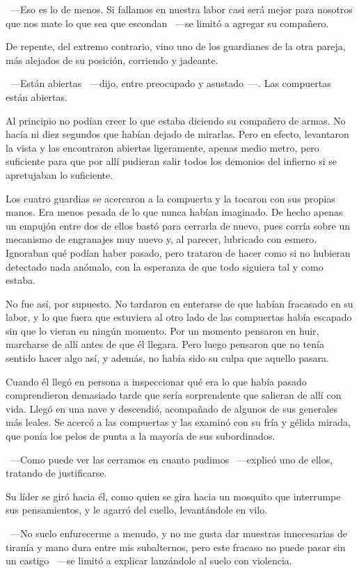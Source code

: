 ~---Eso es lo de menos. Si fallamos en nuestra labor casi será mejor para nosotros que nos mate lo que sea que escondan ~---se limitó a agregar su compañero.

De repente, del extremo contrario, vino uno de los guardianes de la otra pareja, más alejados de su posición, corriendo y jadeante.

~---Están abiertas ~---dijo, entre preocupado y asustado~---. Las compuertas están abiertas.

Al principio no podían creer lo que estaba diciendo su compañero de armas. No hacía ni diez segundos que habían dejado de mirarlas. Pero en efecto, levantaron la vista y las encontraron abiertas ligeramente, apenas medio metro, pero suficiente para que por allí pudieran salir todos los demonios del infierno si se apretujaban lo suficiente.

Los cuatro guardias se acercaron a la compuerta y la tocaron con sus propias manos. Era menos pesada de lo que nunca habían imaginado. De hecho apenas un empujón entre dos de ellos bastó para cerrarla de nuevo, pues corría sobre un mecanismo de engranajes muy nuevo y, al parecer, lubricado con esmero. Ignoraban qué podían haber pasado, pero trataron de hacer como si no hubieran detectado nada anómalo, con la esperanza de que todo siguiera tal y como estaba.

No fue así, por supuesto. No tardaron en enterarse de que habían fracasado en su labor, y lo que fuera que estuviera al otro lado de las compuertas había escapado sin que lo vieran en ningún momento. Por un momento pensaron en huir, marcharse de allí antes de que él llegara. Pero luego pensaron que no tenía sentido hacer algo así, y además, no había sido su culpa que aquello pasara.

Cuando él llegó en persona a inspeccionar qué era lo que había pasado comprendieron demasiado tarde que sería sorprendente que salieran de allí con vida. Llegó en una nave y descendió, acompañado de algunos de sus generales más leales. Se acercó a las compuertas y las examinó con su fría y gélida mirada, que ponía los pelos de punta a la mayoría de sus subordinados.

~---Como puede ver las cerramos en cuanto pudimos ~---explicó uno de ellos, tratando de justificarse.

Su líder se giró hacia él, como quien se gira hacia un mosquito que interrumpe sus pensamientos, y le agarró del cuello, levantándole en vilo.

~---No suelo enfurecerme a menudo, y no me gusta dar muestras innecesarias de tiranía y mano dura entre mis subalternos, pero este fracaso no puede pasar sin un castigo ~---se limitó a explicar lanzándole al suelo con violencia.

